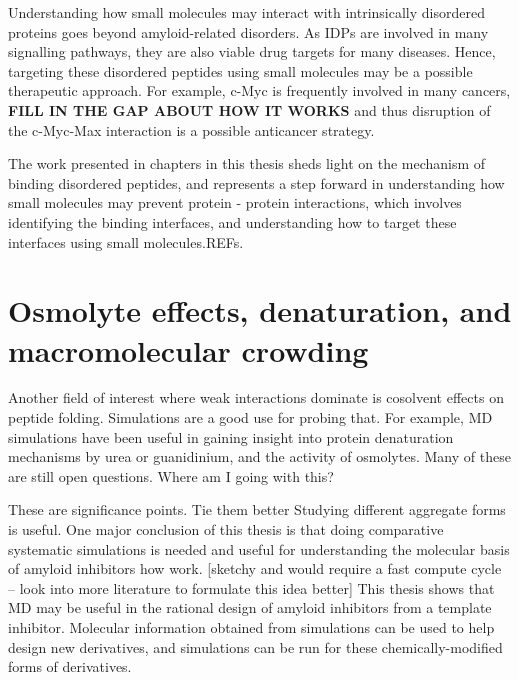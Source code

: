 Understanding how small molecules may interact with intrinsically disordered proteins goes beyond amyloid-related disorders. As IDPs are involved in many signalling pathways, they are also viable drug targets for many diseases. Hence, targeting these disordered peptides using small molecules may be a possible therapeutic approach. For example, c-Myc is frequently involved in many cancers, \textbf{FILL IN THE GAP ABOUT HOW IT WORKS} and thus disruption of the c-Myc-Max interaction is a possible anticancer strategy.\cite{Iakoucheva:2002uv,Metallo:2010p6822,Cuchillo:2012bm}

The work presented in chapters in this thesis sheds light on the mechanism of binding disordered peptides, and represents a step forward in understanding how small molecules may prevent protein - protein interactions, which involves identifying the binding interfaces, and understanding how to target these interfaces using small molecules.REFs.

\section{Osmolyte effects, denaturation, and macromolecular crowding}
Another field of interest where weak interactions dominate is cosolvent effects on peptide folding. Simulations are a good use for probing that.  For example, MD simulations have been useful in gaining insight into protein denaturation mechanisms by urea or guanidinium, and the activity of osmolytes. Many of these are still open questions.\cite{http://pubs.acs.org/doi/abs/10.1021/jp200625k -- crowding and protein association.} Where am I going with this?

These are significance points.  Tie them better Studying different aggregate forms is useful.  One major conclusion of this thesis is that doing comparative systematic simulations is needed and useful for understanding the molecular basis of amyloid inhibitors how work.
[sketchy and would require a fast compute cycle -- look into more literature to formulate this idea better] This thesis shows that MD may be useful in the rational design of amyloid inhibitors from a template inhibitor. Molecular information obtained from simulations can be used to help design new derivatives, and simulations can be run for these chemically-modified forms of derivatives.

